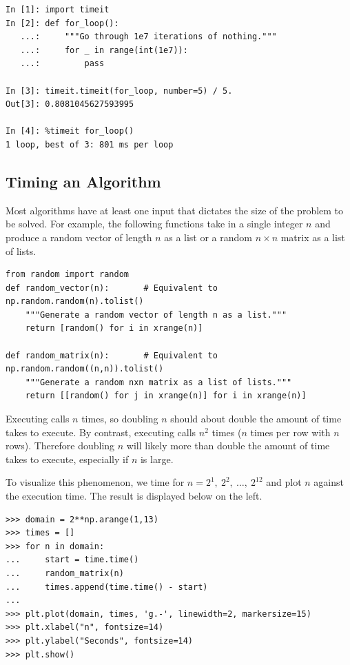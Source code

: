 \begin{lstlisting}
In [1]: import timeit
In [2]: def for_loop():
   ...:     """Go through 1e7 iterations of nothing."""
   ...:     for _ in range(int(1e7)):
   ...:         pass

In [3]: timeit.timeit(for_loop, number=5) / 5.
Out[3]: 0.8081045627593995

In [4]: %timeit for_loop()
1 loop, best of 3: 801 ms per loop
\end{lstlisting}

\subsection*{Timing an Algorithm} %

Most algorithms have at least one input that dictates the size of the problem to be solved.
For example, the following functions take in a single integer $n$ and produce a random vector of length $n$ as a list or a random $n\times n$ matrix as a list of lists.

\begin{lstlisting}
from random import random
def random_vector(n):       # Equivalent to np.random.random(n).tolist()
    """Generate a random vector of length n as a list."""
    return [random() for i in xrange(n)]

def random_matrix(n):       # Equivalent to np.random.random((n,n)).tolist()
    """Generate a random nxn matrix as a list of lists."""
    return [[random() for j in xrange(n)] for i in xrange(n)]
\end{lstlisting}

Executing  calls  $n$ times, so doubling $n$ should about double the amount of time  takes to execute.
By contrast, executing  calls  $n^2$ times ($n$ times per row with $n$ rows).
Therefore doubling $n$ will likely more than double the amount of time  takes to execute, especially if $n$ is large.

To visualize this phenomenon, we time  for $n = 2^1,\ 2^2,\ \ldots,\ 2^{12}$ and plot $n$ against the execution time.
The result is displayed below on the left.

\begin{lstlisting}
>>> domain = 2**np.arange(1,13)
>>> times = []
>>> for n in domain:
...     start = time.time()
...     random_matrix(n)
...     times.append(time.time() - start)
...
>>> plt.plot(domain, times, 'g.-', linewidth=2, markersize=15)
>>> plt.xlabel("n", fontsize=14)
>>> plt.ylabel("Seconds", fontsize=14)
>>> plt.show()
\end{lstlisting}

